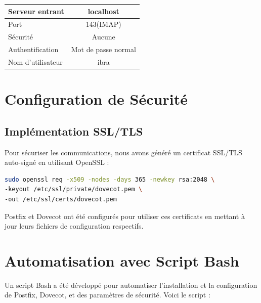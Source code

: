 \documentclass[a4paper,12pt]{article}
\begin{document}
\begin{center}
   \begin{tabular}{ | l | c | }
     \hline
     Serveur entrant & localhost \\ \hline
     Port & 143(IMAP)  \\ \hline
     Sécurité & Aucune  \\
     Authentification & Mot de passe normal  \\
     Nom d'utilisateur & ibra  \\
     \hline
   \end{tabular}
 \end{center}

\section{Configuration de Sécurité}

\subsection{Implémentation SSL/TLS}
Pour sécuriser les communications, nous avons généré un certificat SSL/TLS auto-signé en utilisant OpenSSL :
\begin{lstlisting}[language=bash]
sudo openssl req -x509 -nodes -days 365 -newkey rsa:2048 \
-keyout /etc/ssl/private/dovecot.pem \
-out /etc/ssl/certs/dovecot.pem
\end{lstlisting}
Postfix et Dovecot ont été configurés pour utiliser ces certificats en mettant à jour leurs fichiers de configuration respectifs.

\section{Automatisation avec Script Bash}

Un script Bash a été développé pour automatiser l'installation et la configuration de Postfix, Dovecot, et des paramètres de sécurité. Voici le script :
\end{document}
